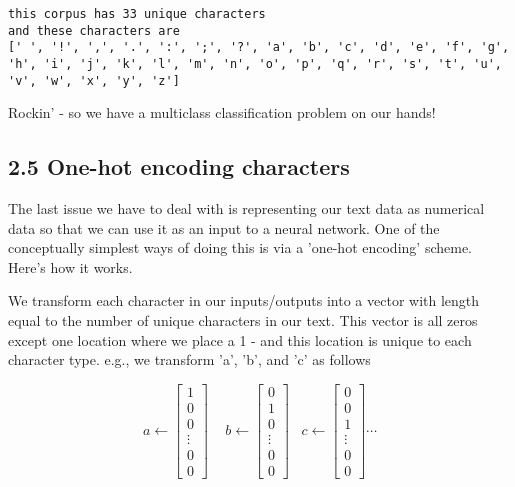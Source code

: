 \documentclass[11pt]{article}
\begin{document}
    \begin{Verbatim}[commandchars=\\\{\}]
this corpus has 33 unique characters
and these characters are 
[' ', '!', ',', '.', ':', ';', '?', 'a', 'b', 'c', 'd', 'e', 'f', 'g', 'h', 'i', 'j', 'k', 'l', 'm', 'n', 'o', 'p', 'q', 'r', 's', 't', 'u', 'v', 'w', 'x', 'y', 'z']

    \end{Verbatim}

    Rockin' - so we have a multiclass classification problem on our hands!

    \subsection{2.5 One-hot encoding
characters}\label{one-hot-encoding-characters}

The last issue we have to deal with is representing our text data as
numerical data so that we can use it as an input to a neural network.
One of the conceptually simplest ways of doing this is via a 'one-hot
encoding' scheme. Here's how it works.

We transform each character in our inputs/outputs into a vector with
length equal to the number of unique characters in our text. This vector
is all zeros except one location where we place a 1 - and this location
is unique to each character type. e.g., we transform 'a', 'b', and 'c'
as follows

\[a\longleftarrow\left[\begin{array}{c}
1\\
0\\
0\\
\vdots\\
0\\
0
\end{array}\right]\,\,\,\,\,\,\,b\longleftarrow\left[\begin{array}{c}
0\\
1\\
0\\
\vdots\\
0\\
0
\end{array}\right]\,\,\,\,\,c\longleftarrow\left[\begin{array}{c}
0\\
0\\
1\\
\vdots\\
0\\
0 
\end{array}\right]\cdots\]
\end{document}
